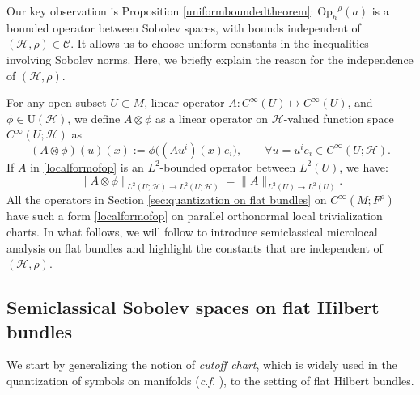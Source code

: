 \documentclass[11pt,oneside,reqno]{amsart}
\newcommand\Oph{\ensuremath{\mathrm{Op}_h}}
\theoremstyle{definition}
\numberwithin{equation}{section}
\theoremstyle{plain}
\begin{document}
Our key observation is Proposition \ref{uniformboundedtheorem}: $\Oph^{\rho}(a)$ is a bounded operator between Sobolev spaces, with bounds independent of $(\mathcal{H},\rho)\in \mathcal{C}$. It allows us to choose uniform constants in the inequalities involving Sobolev norms. Here, we briefly explain the reason for the independence of $(\mathcal{H},\rho)$. 


For any open subset $U\subset M$, linear operator $A: C^{\infty}(U)\mapsto C^{\infty}(U)$, and $\phi \in \mathrm{U}(\mathcal{H})$, we define $A\otimes \phi$ as a linear operator on $\mathcal{H}$-valued function space $C^{\infty}(U;\mathcal{H})$ as
\begin{equation}\label{localformofop}
(A\otimes\phi)(u)(x):=\phi\big((Au^i)(x) e_{i}\big), \qquad \forall u=u^i e_i \in C^{\infty}(U;\mathcal{H}).
\end{equation}
If $A$ in \eqref{localformofop} is an $L^2$-bounded operator between $L^2(U)$, we have:
\begin{equation}\label{squaretensorextension}
\|A\otimes \phi\|_{L^2(U;\mathcal{H}) \rightarrow L^2(U;\mathcal{H})}=\|A\|_{L^2(U) \rightarrow L^2(U)}.
\end{equation}
All the operators in Section \ref{sec:quantization on flat bundles} on $C^{\infty}(M;F^{\rho})$ have such a form \eqref{localformofop} on parallel orthonormal local trivialization charts. In what follows, we will follow \cite[Appendix E]{dyatlovzworski2019resonances} to introduce semiclassical microlocal analysis on flat bundles and highlight the constants that are independent of $(\mathcal{H},\rho)$.



\subsection{Semiclassical Sobolev spaces on flat Hilbert bundles}\label{subsec:semisobolev}

We start by generalizing the notion of \emph{cutoff chart}, which is widely used in the quantization of symbols on manifolds (\emph{c.f.} \cite[Definition E.9]{dyatlovzworski2019resonances}), to the setting of flat Hilbert bundles.

\end{document}
